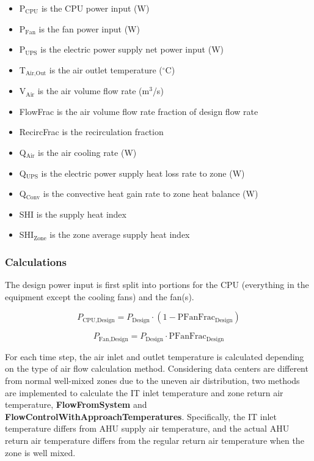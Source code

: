 \begin{itemize}
\tightlist
\item
  P$_\textrm{CPU}$ is the CPU power input (W)
\item
  P$_\textrm{Fan}$ is the fan power input (W)
\item
  P$_\textrm{UPS}$ is the electric power supply net power input (W)
\item
  T$_\textrm{Air,Out}$ is the air outlet temperature ($^\circ$C)
\item
  V$_\textrm{Air}$ is the air volume flow rate (m$^3$/s)
\item
  FlowFrac is the air volume flow rate fraction of design flow rate
\item
  RecircFrac is the recirculation fraction
\item
  Q$_\textrm{Air}$ is the air cooling rate (W)
\item
  Q$_\textrm{UPS}$ is the electric power supply heat loss rate to zone (W)
\item
  Q$_\textrm{Conv}$ is the convective heat gain rate to zone heat balance (W)
\item
  SHI is the supply heat index
\item
  SHI$_{\textrm{Zone}}$ is the zone average supply heat index
\end{itemize}

\subsubsection{Calculations}\label{calculations}

The design power input is first split into portions for the CPU (everything in the equipment except the cooling fans) and the fan(s).

\begin{equation}
P_{\textrm{CPU,Design}} = P_{\textrm{Design}} \cdot (1 - \textrm{PFanFrac}_{\textrm{Design}})
\end{equation}

\begin{equation}
P_{\textrm{Fan,Design}} = P_{\textrm{Design}} \cdot \textrm{PFanFrac}_{\textrm{Design}}
\end{equation}

For each time step,  the air inlet and outlet temperature is calculated depending on the type of air flow calculation method. Considering data centers are different from normal well-mixed zones due to the uneven air distribution, two methods are implemented to calculate the IT inlet temperature and zone return air temperature, \textbf{FlowFromSystem} and \textbf{FlowControlWithApproachTemperatures}. Specifically, the IT inlet temperature differs from AHU supply air temperature, and the actual AHU return air temperature differs from the regular return air temperature when the zone is well mixed.

